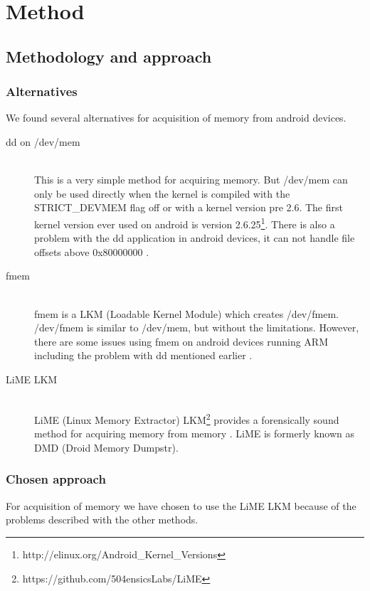 \section{Method}
\subsection{Methodology and approach}
  \subsubsection{Alternatives}
  We found several alternatives for acquisition of memory from android devices.
  \begin{description}
    \item[dd on /dev/mem] \hfill \\
      This is a very simple method for acquiring memory. But /dev/mem can only be used directly when the kernel is 
      compiled with the STRICT\_DEVMEM flag off or with a kernel version pre 2.6. The first kernel version ever used on 
      android is version 2.6.25\footnote{http://elinux.org/Android\_Kernel\_Versions}. There is also a problem with 
      the dd application in android devices, it can not handle file offsets above 0x80000000 \cite{acq_vol_android_mem}.
    \item[fmem] \hfill \\
      fmem is a LKM (Loadable Kernel Module) which creates /dev/fmem. /dev/fmem is similar to /dev/mem, but without the limitations. 
      However, there are some issues using fmem on android devices running ARM including the problem with dd mentioned earlier \cite{acq_vol_android_mem}.
    \item[LiME LKM] \hfill \\
      LiME (Linux Memory Extractor) LKM\footnote{https://github.com/504ensicsLabs/LiME} provides a forensically sound method for acquiring memory from 
      memory \cite{heriyanto2013procedures}. LiME is formerly known as DMD (Droid Memory Dumpstr).
  \end{description}
  \subsubsection{Chosen approach}
  For acquisition of memory we have chosen to use the LiME LKM because of the problems described with the other methods.
